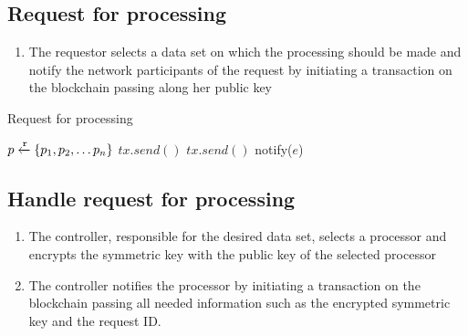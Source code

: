 \subsection{Request for processing}
\label{solution:flow:pr_req}

\begin{enumerate}
  \item The requestor selects a data set on which the processing should be made and  notify the network participants of the request by initiating a transaction on the blockchain passing along her public key
\end{enumerate}

\begin{algorithm}[!htb]
  \caption{Request for processing}\label{alg:data_request}
  \begin{algorithmic}[1]
    \State $p \xleftarrow{\mathtt{r}} \{ p_1, p_2, \dots p_n \}$ 
     
     
    \State $tx.send()$
    \State {}
  \EndFunction
    \State $tx.send()$
    \State {}
  \EndProcedure
     
        \State notify($e$) 
      \EndIf
    \EndWhile
  \EndProcedure
  \end{algorithmic}
\end{algorithm}

\subsection{Handle request for processing}
\label{solution:flow:handle_request}

\begin{enumerate}
  \item The controller, responsible for the desired data set, selects a processor and encrypts the symmetric key with the public key of the selected processor
  \item The controller notifies the processor by initiating a transaction on the blockchain passing all needed information such as the encrypted symmetric key and the request ID.
\end{enumerate}

